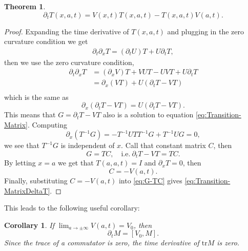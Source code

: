 \documentclass[english,master]{liumaiex}
\theoremstyle{thesisplain}
\newtheorem{corollary}[proposition]{Corollary}
\newtheorem{theorem}[proposition]{Theorem}
\theoremstyle{thesisdefinition}
\newcommand{\tr}{\text{tr}}
\numberwithin{equation}{section}
\begin{document}
\begin{theorem}
	\begin{equation} \label{eq:Transition-MatrixDeltaT}
		\partial_t T(x,a,t) = V(x,t) T(x,a,t) - T(x,a,t) V(a,t).
	\end{equation}
\end{theorem}
\begin{proof}
	Expanding the time derivative of $T(x,a,t)$ and plugging in the zero curvature condition we get
	\begin{equation}
	\begin{aligned}
		\partial_t \partial_x T = (\partial_t U) T + U \partial_t T,
	\end{aligned}
	\end{equation}
	then we use the zero curvature condition,
	\begin{equation}
	\begin{aligned}
		\partial_t \partial_x T 
			&= (\partial_x V)T + VUT - UVT + U \partial_t T \\
			&= \partial_x (VT) + U(\partial_t T - VT) \\
	\end{aligned}
	\end{equation}
	which is the same as
	\begin{equation}
		\partial_x (\partial_t T - VT) = U(\partial_t T - VT).
	\end{equation}
	This means that $G=\partial_t T - VT$ also is a solution to equation \eqref{eq:Transition-Matrix}.
	Computing
	\begin{equation}
		\partial_x (T^{-1}G) = -T^{-1}UTT^{-1}G + T^{-1}UG = 0,
	\end{equation}
	we see that $T^{-1}G$ is independent of $x$. Call that constant matrix $C$, then
	\begin{equation} \label{eq:G-TC}
		G = TC, \quad \text{i.e.} \ \partial_t T - VT = TC.
	\end{equation}
	By letting $x = a$ we get that $T(a,a,t) = I$ and $\partial_x T = 0$, then
	\begin{equation}
		C = -V(a, t).
	\end{equation}
	Finally, substituting $C=-V(a,t)$ into \eqref{eq:G-TC} gives \eqref{eq:Transition-MatrixDeltaT}.
\end{proof}
This leads to the following useful corollary:
\begin{corollary} \label{cor:Monodromy}
	If $\lim_{a \rightarrow \pm \infty} V(a,t) = V_0$, then
	\begin{equation}
		\partial_t M = [V_0, M].
	\end{equation}
	Since the trace of a commutator is zero, the time derivative of $\tr M$ is zero.
\end{corollary}
\end{document}
